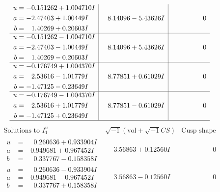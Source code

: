 \documentclass[1p]{elsarticle_modified}
\theoremstyle{definition}
\newcommand{\I}{\sqrt{-1}}
\begin{document}
$$\begin{array}{c|c|c}
\begin{aligned}
u &= -0.151262 + 1.004710 I \\
a &= -2.47403 + 1.00449 I \\
b &= \phantom{-}1.40269 + 0.20603 I\end{aligned}
 & \phantom{-}8.14096 - 5.43626 I & \phantom{-0.000000 } 0 \\ \hline\begin{aligned}
u &= -0.151262 - 1.004710 I \\
a &= -2.47403 - 1.00449 I \\
b &= \phantom{-}1.40269 - 0.20603 I\end{aligned}
 & \phantom{-}8.14096 + 5.43626 I & \phantom{-0.000000 } 0 \\ \hline\begin{aligned}
u &= -0.176749 + 1.004370 I \\
a &= \phantom{-}2.53616 - 1.01779 I \\
b &= -1.47125 - 0.23649 I\end{aligned}
 & \phantom{-}8.77851 + 0.61029 I & \phantom{-0.000000 } 0 \\ \hline\begin{aligned}
u &= -0.176749 - 1.004370 I \\
a &= \phantom{-}2.53616 + 1.01779 I \\
b &= -1.47125 + 0.23649 I\end{aligned}
 & \phantom{-}8.77851 - 0.61029 I & \phantom{-0.000000 } 0\\
 \hline 
 \end{array}$$\newpage$$\begin{array}{c|c|c}  
\text{Solutions to }I^u_{1}& \I (\text{vol} + \sqrt{-1}CS) & \text{Cusp shape}\\
 \hline 
\begin{aligned}
u &= \phantom{-}0.260636 + 0.933904 I \\
a &= -0.949681 + 0.967452 I \\
b &= \phantom{-}0.337767 - 0.158358 I\end{aligned}
 & \phantom{-}3.56863 + 0.12560 I & \phantom{-0.000000 } 0 \\ \hline\begin{aligned}
u &= \phantom{-}0.260636 - 0.933904 I \\
a &= -0.949681 - 0.967452 I \\
b &= \phantom{-}0.337767 + 0.158358 I\end{aligned}
 & \phantom{-}3.56863 - 0.12560 I & \phantom{-0.000000 } 0 \\ \hline\begin{aligned}

\end{aligned}
\end{array}$$
\end{document}
